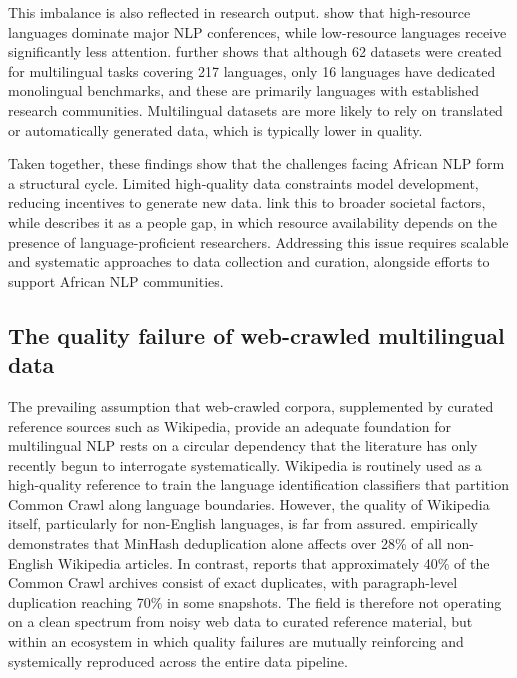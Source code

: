 \documentclass[12pt]{ThesisRU}
\begin{document}
This imbalance is also reflected in research output. \citet{joshi2020state} show that high-resource languages dominate major NLP conferences, while low-resource languages receive significantly less attention. \citet{yu2022beyond} further shows that although 62 datasets were created for multilingual tasks covering 217 languages, only 16 languages have dedicated monolingual benchmarks, and these are primarily languages with established research communities. Multilingual datasets are more likely to rely on translated or automatically generated data, which is typically lower in quality.

Taken together, these findings show that the challenges facing African NLP form a structural cycle. Limited high-quality data constraints model development, reducing incentives to generate new data. \citet{nekoto2020participatory} link this to broader societal factors, while \citet{yu2022beyond} describes it as a people gap, in which resource availability depends on the presence of language-proficient researchers. Addressing this issue requires scalable and systematic approaches to data collection and curation, alongside efforts to support African NLP communities.

\subsection{The quality failure of web-crawled multilingual data}

The prevailing assumption that web-crawled corpora, supplemented by curated reference sources such as Wikipedia, provide an adequate foundation for multilingual NLP rests on a circular dependency that the literature has only recently begun to interrogate systematically. Wikipedia is routinely used as a high-quality reference to train the language identification classifiers that partition Common Crawl along language boundaries. However, the quality of Wikipedia itself, particularly for non-English languages, is far from assured. \citet{tatariya2024good} empirically demonstrates that MinHash deduplication alone affects over 28\% of all non-English Wikipedia articles. In contrast, \citet{perelkiewicz2024review} reports that approximately 40\% of the Common Crawl archives consist of exact duplicates, with paragraph-level duplication reaching 70\% in some snapshots. The field is therefore not operating on a clean spectrum from noisy web data to curated reference material, but within an ecosystem in which quality failures are mutually reinforcing and systemically reproduced across the entire data pipeline.
\end{document}
